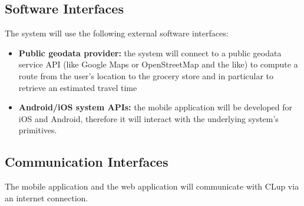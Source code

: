 \subsection{Software Interfaces}
The system will use the following external software interfaces:
\begin{itemize}
    \item \textbf{Public geodata provider:} the system will connect to a public geodata service API (like Google Maps or OpenStreetMap and the like) to compute a route from the user's location to the grocery store and in particular to retrieve an estimated travel time
    \item \textbf{Android/iOS system APIs:} the mobile application will be developed for iOS and Android, therefore it will interact with the underlying system's primitives.
\end{itemize}

\subsection{Communication Interfaces}
The mobile application and the web application will communicate with CLup via an internet connection.